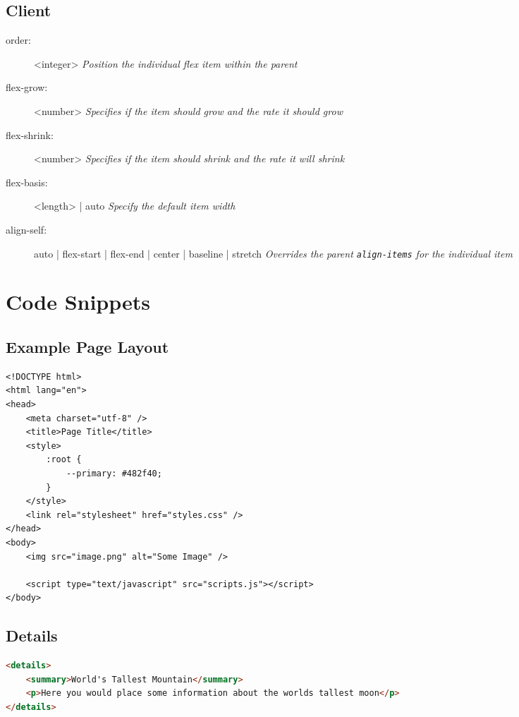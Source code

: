 \documentclass[12pt, a4paper]{article}
\begin{document}
\begin{multicols}{2}
		\subsection{Client}
		\begin{description}
			\item[order:] <integer>
			\subitem\textit{Position the individual flex item within the parent}
			\item[flex-grow:] <number>
			\subitem\textit{Specifies if the item should grow and the rate it should grow}
			\item[flex-shrink:] <number>
			\subitem\textit{Specifies if the item should shrink and the rate it will shrink}
			\item[flex-basis:] <length> | auto
			\subitem\textit{Specify the default item width}
			\item[align-self:] auto | flex-start | flex-end | center | baseline | stretch
			\subitem\textit{Overrides the parent \texttt{align-items} for the individual item}
		\end{description}
		
	\end{multicols}
		
	\section{Code Snippets}
	\subsection{Example Page Layout}
	\begin{lstlisting}
<!DOCTYPE html>
<html lang="en">
<head>
	<meta charset="utf-8" />
	<title>Page Title</title>
	<style>
		:root {
			--primary: #482f40;
		}
	</style>
	<link rel="stylesheet" href="styles.css" />
</head>
<body>
	<img src="image.png" alt="Some Image" />

	<script type="text/javascript" src="scripts.js"></script>
</body>	
	\end{lstlisting}
	

	\subsection{Details}
	\begin{lstlisting}[language=html]
<details>
	<summary>World's Tallest Mountain</summary>
	<p>Here you would place some information about the worlds tallest moon</p>
</details>
	\end{lstlisting}
\end{document}
